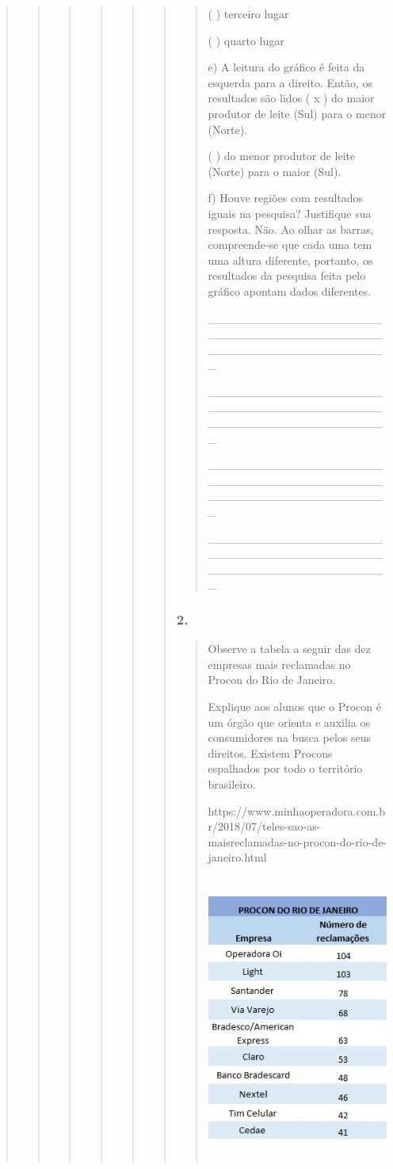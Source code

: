 \begin{quote}
\begin{quote}
\begin{quote}
\begin{quote}
\begin{quote}
\begin{quote}
\begin{quote}
( ) terceiro lugar

( ) quarto lugar

e) A leitura do gráfico é feita da esquerda para a direito. Então, os
resultados são lidos ( x ) do maior produtor de leite (Sul) para o menor
(Norte).

( ) do menor produtor de leite (Norte) para o maior (Sul).

f) Houve regiões com resultados iguais na pesquisa? Justifique sua
resposta. Não. Ao olhar as barras, compreende-se que cada uma tem uma
altura diferente, portanto, os resultados da pesquisa feita pelo gráfico
apontam dados diferentes.

\_\_\_\_\_\_\_\_\_\_\_\_\_\_\_\_\_\_\_\_\_\_\_\_\_\_\_\_\_\_\_\_\_\_\_\_\_\_\_\_\_\_\_\_\_\_\_\_\_\_\_\_\_\_\_\_\_\_\_\_\_\_\_\_

\_\_\_\_\_\_\_\_\_\_\_\_\_\_\_\_\_\_\_\_\_\_\_\_\_\_\_\_\_\_\_\_\_\_\_\_\_\_\_\_\_\_\_\_\_\_\_\_\_\_\_\_\_\_\_\_\_\_\_\_\_\_\_\_

\_\_\_\_\_\_\_\_\_\_\_\_\_\_\_\_\_\_\_\_\_\_\_\_\_\_\_\_\_\_\_\_\_\_\_\_\_\_\_\_\_\_\_\_\_\_\_\_\_\_\_\_\_\_\_\_\_\_\_\_\_\_\_\_

\_\_\_\_\_\_\_\_\_\_\_\_\_\_\_\_\_\_\_\_\_\_\_\_\_\_\_\_\_\_\_\_\_\_\_\_\_\_\_\_\_\_\_\_\_\_\_\_\_\_\_\_\_\_\_\_\_\_\_\_\_\_\_\_
\end{quote}

\subsubsection{2. }\label{section-67}

\begin{quote}
Observe a tabela a seguir das dez empresas mais reclamadas no Procon do
Rio de Janeiro.

Explique aos alunos que o Procon é um órgão que orienta e auxilia os
consumidores na busca pelos seus direitos. Existem Procons espalhados
por todo o território brasileiro.

https://www.minhaoperadora.com.br/2018/07/teles-sao-as-maisreclamadas-no-procon-do-rio-de-janeiro.html

\includegraphics[width=2.72917in,height=3.70833in]{media/image30.jpeg}


\end{quote}
\end{quote}
\end{quote}
\end{quote}
\end{quote}
\end{quote}
\end{quote}
